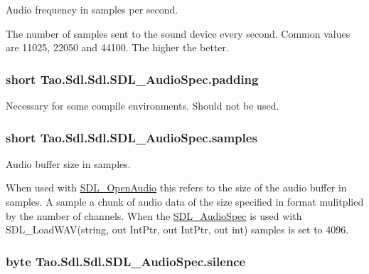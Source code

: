 Audio frequency in samples per second. 

The number of samples sent to the sound device every second. Common values are 11025, 22050 and 44100. The higher the better. \hypertarget{struct_tao_1_1_sdl_1_1_sdl_1_1_s_d_l___audio_spec_a8aaeb1676ee76d59b18b8f15d0645082}{
\subsubsection[{padding}]{\setlength{\rightskip}{0pt plus 5cm}short {\bf Tao.Sdl.Sdl.SDL\_\-AudioSpec.padding}}}
\label{struct_tao_1_1_sdl_1_1_sdl_1_1_s_d_l___audio_spec_a8aaeb1676ee76d59b18b8f15d0645082}


Necessary for some compile environments. Should not be used. 

\hypertarget{struct_tao_1_1_sdl_1_1_sdl_1_1_s_d_l___audio_spec_afa691595ab4d7ca52143e9e79bf480dd}{
\subsubsection[{samples}]{\setlength{\rightskip}{0pt plus 5cm}short {\bf Tao.Sdl.Sdl.SDL\_\-AudioSpec.samples}}}
\label{struct_tao_1_1_sdl_1_1_sdl_1_1_s_d_l___audio_spec_afa691595ab4d7ca52143e9e79bf480dd}


Audio buffer size in samples. 

When used with \hyperlink{_sdl_8cs_ad374c9d61753113b30c8c4b96295ff3b}{SDL\_\-OpenAudio} this refers to the size of the audio buffer in samples. A sample a chunk of audio data of the size specified in format mulitplied by the number of channels. When the \hyperlink{struct_tao_1_1_sdl_1_1_sdl_1_1_s_d_l___audio_spec}{SDL\_\-AudioSpec} is used with SDL\_\-LoadWAV(string, out IntPtr, out IntPtr, out int) samples is set to 4096. \hypertarget{struct_tao_1_1_sdl_1_1_sdl_1_1_s_d_l___audio_spec_ac88a22044c9fea1ef170a7b153015f25}{
\subsubsection[{silence}]{\setlength{\rightskip}{0pt plus 5cm}byte {\bf Tao.Sdl.Sdl.SDL\_\-AudioSpec.silence}}}
\label{struct_tao_1_1_sdl_1_1_sdl_1_1_s_d_l___audio_spec_ac88a22044c9fea1ef170a7b153015f25}


